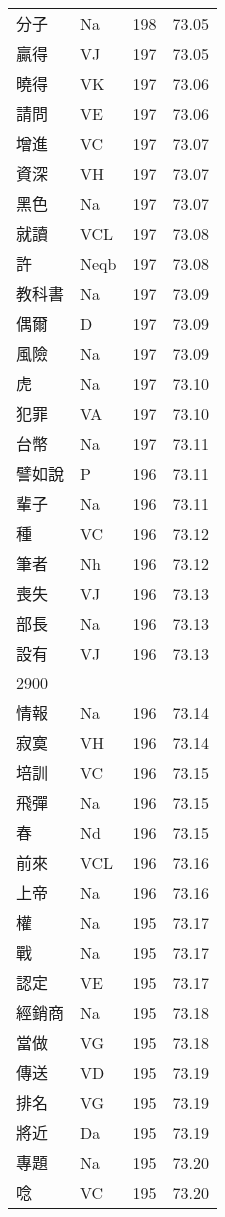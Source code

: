 \documentclass[twocolumn]{book}
\begin{document}
\begin{supertabular}{llrr}
分子 & Na & 198 &  73.05\\
贏得 & VJ & 197 &  73.05\\
曉得 & VK & 197 &  73.06\\
請問 & VE & 197 &  73.06\\
增進 & VC & 197 &  73.07\\
資深 & VH & 197 &  73.07\\
黑色 & Na & 197 &  73.07\\
就讀 & VCL & 197 &  73.08\\
許 & Neqb & 197 &  73.08\\
教科書 & Na & 197 &  73.09\\
偶爾 & D & 197 &  73.09\\
風險 & Na & 197 &  73.09\\
虎 & Na & 197 &  73.10\\
犯罪 & VA & 197 &  73.10\\
台幣 & Na & 197 &  73.11\\
譬如說 & P & 196 &  73.11\\
輩子 & Na & 196 &  73.11\\
種 & VC & 196 &  73.12\\
筆者 & Nh & 196 &  73.12\\
喪失 & VJ & 196 &  73.13\\
部長 & Na & 196 &  73.13\\
設有 & VJ & 196 &  73.13\\
2900\\
情報 & Na & 196 &  73.14\\
寂寞 & VH & 196 &  73.14\\
培訓 & VC & 196 &  73.15\\
飛彈 & Na & 196 &  73.15\\
春 & Nd & 196 &  73.15\\
前來 & VCL & 196 &  73.16\\
上帝 & Na & 196 &  73.16\\
權 & Na & 195 &  73.17\\
戰 & Na & 195 &  73.17\\
認定 & VE & 195 &  73.17\\
經銷商 & Na & 195 &  73.18\\
當做 & VG & 195 &  73.18\\
傳送 & VD & 195 &  73.19\\
排名 & VG & 195 &  73.19\\
將近 & Da & 195 &  73.19\\
專題 & Na & 195 &  73.20\\
唸 & VC & 195 &  73.20\\

\end{supertabular}
\end{document}
